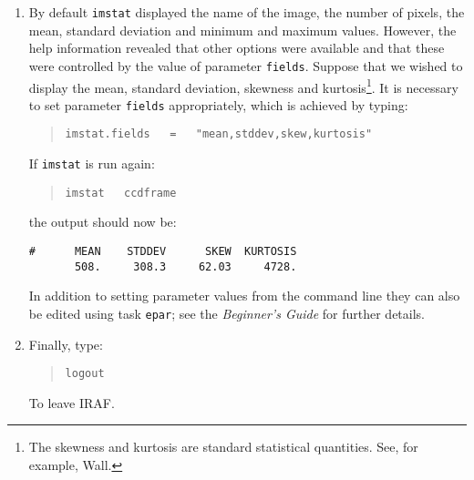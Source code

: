 \documentclass[twoside,11pt]{article}
\begin{document}
\begin{enumerate}
   The output should be something like:

  \begin{verbatim}
       images = "ccdframe"      Images
      (fields = "image,npix,mean,stddev,min,max") Fields to be printed
       (lower = INDEF)          Lower cutoff for pixel values
       (upper = INDEF)          Upper cutoff for pixel values
    (binwidth = 0.1)            Bin width of histogram in sigma
      (format = yes)            Format output and print column labels?
        (mode = "ql")
  \end{verbatim}

   The parameters enclosed in brackets are hidden (in this case this
   is all of them except {\tt images}).

  \item By default {\tt imstat} displayed the name of the image, the
   number of pixels, the mean, standard deviation and minimum and
   maximum values.  However, the help information revealed that other
   options were available and that these were controlled by the value
   of parameter {\tt fields}.  Suppose that we wished to display the
   mean, standard deviation, skewness and kurtosis\footnote{The
   skewness and kurtosis are standard statistical quantities.  See,
   for example, Wall\cite{WALL79}.}.  It is necessary to set parameter
   {\tt fields} appropriately, which is achieved by typing:

  \begin{quote}
   {\tt imstat.fields ~ = ~ "mean,stddev,skew,kurtosis"}
  \end{quote}

   If {\tt imstat} is run again:

  \begin{quote}
   {\tt imstat ~ ccdframe}
  \end{quote}

   the output should now be:

  \begin{verbatim}
#      MEAN    STDDEV      SKEW  KURTOSIS
       508.     308.3     62.03     4728.
  \end{verbatim}

   In addition to setting parameter values from the command line they
   can also be edited using task {\tt epar}; see the {\it Beginner's
   Guide}\/\cite{BARNES93} for further details.

  \item Finally, type:

  \begin{quote}
   {\tt logout}
  \end{quote}

   To leave IRAF.

\end{enumerate}
\end{document}
